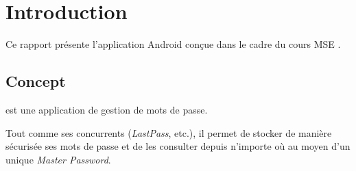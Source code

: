 
\section{Introduction}

Ce rapport présente l'application Android \easypass{} conçue dans le cadre du cours MSE . 

\subsection{Concept}

\easypass{} est une application de gestion de mots de passe. 

Tout comme ses concurrents (\emph{LastPass}, etc.), il permet de stocker de manière sécurisée ses mots de passe et de les consulter depuis n'importe où au moyen d'un unique \emph{Master Password}.

